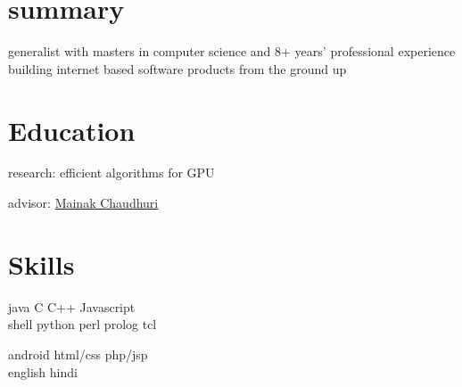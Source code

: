 
\begin{minipage}[t]{0.32\textwidth} %

\section{summary}
\location{}
generalist with masters in computer science and 8+ years' professional experience building internet based software products from the ground up
\sectionspace %

\section{Education} 
\vspace{\topsep} %
\vspace{1pt}
\begin{tightitemize}
\item research: efficient algorithms for GPU
\item advisor: \href{https://www.cse.iitk.ac.in/users/mainakc/}{Mainak Chaudhuri} 
\end{tightitemize}
\vspace{6pt}




\sectionspace %

\section{Skills}

java \textbullet{} C \textbullet{} C++ \textbullet{} Javascript\\ 
shell \textbullet{} python \textbullet{} perl \textbullet{} prolog \textbullet{} tcl\\
\sectionspace %

android \textbullet{} html/css \textbullet{} php/jsp \\
english \textbullet{} hindi\\ 


\end{minipage}
